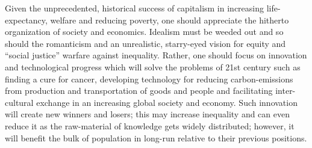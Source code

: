\documentclass[12pt]{article}
\newcommand{\1}{\mathbbm 1}
\begin{document}
		Given the unprecedented, historical success of capitalism in increasing life-expectancy, welfare and reducing poverty, one should appreciate the hitherto organization of society and economics. Idealism must be weeded out and so should the romanticism and an unrealistic, starry-eyed vision for equity and ``social justice'' warfare against inequality. Rather, one should focus on innovation and technological progress which will solve the problems of 21st century such as finding a cure for cancer, developing technology for reducing carbon-emissions from production and transportation of goods and people and facilitating inter-cultural exchange in an increasing global society and economy. Such innovation will create new winners and losers; this may increase inequality and can even reduce it as the raw-material of knowledge gets widely distributed; however, it will benefit the bulk of population in long-run relative to their previous positions.
	
		\newpage
		
		

		\singlespacing
		
		
		\clearpage
		
		
		
		
		
		
		\newpage
		
		
		
		
		
		
		
		
		
		
		
		
		
		
		
	
\end{document}
